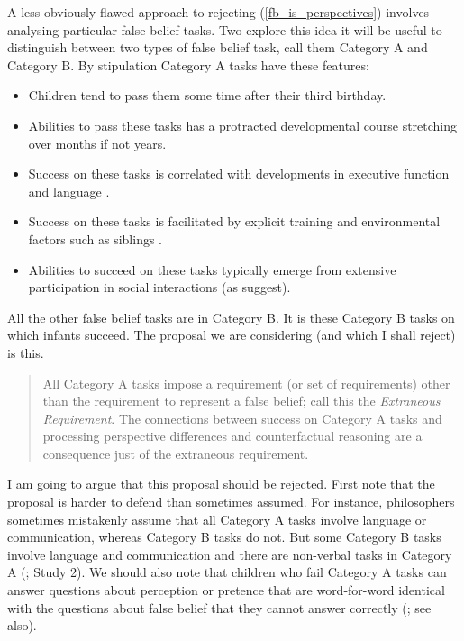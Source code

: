 \documentclass[12pt,\papersize]{extarticle}
\begin{document}
A less obviously flawed approach to rejecting (\ref{fb_is_perspectives}) involves analysing particular false belief tasks.
Two explore this idea it will be useful to distinguish between two types of false belief task, call them Category A and Category B.
By stipulation Category A tasks have these features:
\begin{itemize}
\item Children tend to pass them some time after their third birthday.
\item Abilities to pass these tasks has a protracted developmental course stretching over months if not years.
\item Success on these tasks is correlated with developments in executive function \citep[]{en_410, en_1130} and language \citep[]{en_1209}.
\item Success on these tasks is facilitated by explicit training \citep[]{en_85} and environmental factors such as siblings \citep[]{en_507, en_1299}.  
\item Abilities to succeed on these tasks typically emerge from extensive participation in social interactions (as \citealp{en_1300} suggest).
\end{itemize}
All the other false belief tasks are in Category B.
It is these Category B tasks on which infants succeed.
The proposal we are considering (and which I shall reject) is this.  
\begin{quote}
	All Category A tasks impose a requirement (or set of requirements) other than the requirement to represent a false belief;
call this the \emph{Extraneous Requirement}.
	The connections between success on Category A tasks and processing perspective differences and counterfactual reasoning are a consequence just of the extraneous requirement.
\end{quote}
I am going to argue that this proposal should be rejected.
First note that the proposal is harder to defend than sometimes assumed.
For instance, philosophers sometimes mistakenly assume that all Category A tasks involve language or communication, whereas Category B tasks do not.
But some Category B tasks involve language and communication 
\citep{Knudsen:2011fk,Song:2008qo}
and there are non-verbal tasks in Category A
(\citealp{Call:1999co}; \citealp{low:2010_preschoolers} Study 2).
We should also note that children who fail Category A tasks can answer questions about perception or pretence that are word-for-word identical with the questions about false belief that they cannot answer correctly (\citealp{Gopnik:1994cb}; see also\citealp{Cluster:1996ht}).
\end{document}
